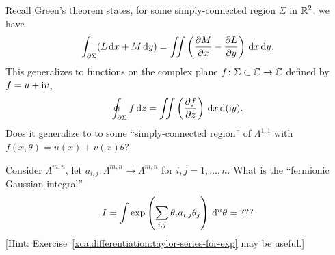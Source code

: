 \begin{puzzle}
Recall Green's theorem states, for some simply-connected region $\Sigma$ in $\mathbb{R}^{2}$,
we have
\begin{equation}
\int_{\partial\Sigma}(L\,\mathrm{d} x+M\,\mathrm{d} y) = \iint\left(\frac{\partial M}{\partial x}-\frac{\partial L}{\partial y}\right)\,\mathrm{d} x\,\mathrm{d} y.
\end{equation}
This generalizes to functions on the complex plane $f\colon\Sigma\subset\mathbb{C}\to\mathbb{C}$
defined by $f=u+\mathrm{i} v$,
\begin{equation}
\oint_{\partial\Sigma}f\,\mathrm{d} z = \iint\left(\frac{\partial f}{\partial
  z}\right)\,\mathrm{d} x\,\mathrm{d}(\mathrm{i} y).
\end{equation}
Does it generalize to to some ``simply-connected region'' of
$\Lambda^{1,1}$ with $f(x,\theta)=u(x)+v(x)\theta$?
\end{puzzle}

\begin{puzzle}
Consider $\Lambda^{m,n}$, let
$a_{i,j}\colon\Lambda^{m,n}\to\Lambda^{m,n}$ for $i,j=1,\dots,n$.
What is the ``fermionic Gaussian integral''
\begin{equation}
I =
\int\exp\left(\sum_{i,j}\theta_{i}a_{i,j}\theta_{j}\right)\,\mathrm{d}^{n}\theta
= \mathbf{???}
\end{equation}
[Hint: Exercise~\ref{xca:differentiation:taylor-series-for-exp} may be useful.]
\end{puzzle}

